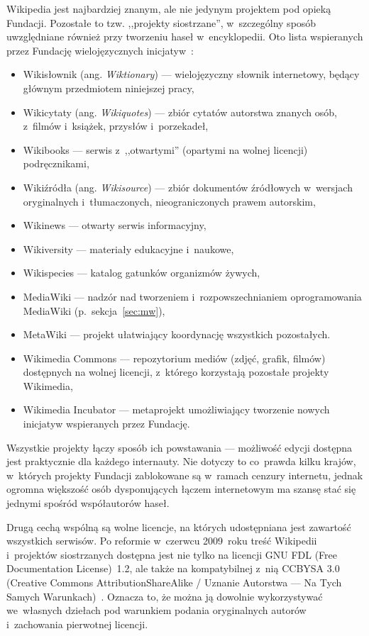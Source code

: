 Wikipedia jest najbardziej znanym, ale nie jedynym projektem pod opieką Fundacji. Pozostałe to tzw. ,,projekty siostrzane'', w~szczególny sposób uwzględniane również przy tworzeniu haseł w~encyklopedii. Oto lista wspieranych przez Fundację wielojęzycznych inicjatyw~\cite{wm:main}:
\begin{itemize}
	\item Wikisłownik (ang. \emph{Wiktionary}) --- wielojęzyczny słownik internetowy, będący głównym przedmiotem niniejszej pracy,
	\item Wikicytaty (ang. \emph{Wikiquotes}) --- zbiór cytatów autorstwa znanych osób, z~filmów i~książek, przysłów i~porzekadeł,
	\item Wikibooks --- serwis z~,,otwartymi'' (opartymi na wolnej licencji) podręcznikami,
	\item Wikiźródła (ang. \emph{Wikisource}) --- zbiór dokumentów źródłowych w~wersjach oryginalnych i~tłumaczonych, nieograniczonych prawem autorskim,
	\item Wikinews --- otwarty serwis informacyjny,
	\item Wikiversity --- materiały edukacyjne i~naukowe,
	\item Wikispecies --- katalog gatunków organizmów żywych,
	\item MediaWiki --- nadzór nad tworzeniem i~rozpowszechnianiem oprogramowania MediaWiki (p.~sekcja~\ref{sec:mw}),
	\item Meta\dywiz{}Wiki --- projekt ułatwiający koordynację wszystkich pozostałych.
	\item Wikimedia Commons --- repozytorium mediów (zdjęć, grafik, filmów) dostępnych na wolnej licencji, z~którego korzystają pozostałe projekty Wikimedia,
	\item Wikimedia Incubator --- metaprojekt umożliwiający tworzenie nowych inicjatyw wspieranych przez Fundację.
\end{itemize}
Wszystkie projekty łączy sposób ich powstawania --- możliwość edycji dostępna jest praktycznie dla każdego internauty. Nie dotyczy to co~prawda kilku krajów, w~których projekty Fundacji zablokowane są w~ramach cenzury internetu, jednak ogromna większość osób dysponujących łączem internetowym ma szansę stać się jednymi spośród współautorów haseł.

Drugą cechą wspólną są wolne licencje, na których udostępniana jest zawartość wszystkich serwisów. Po reformie w~czerwcu 2009~roku treść Wikipedii i~projektów siostrzanych dostępna jest nie tylko na licencji GNU FDL (Free Documentation License)~1.2, ale także na kompatybilnej z~nią CC\dywiz{}BY\dywiz{}SA 3.0 (Creative Commons Attribution\dywiz{}ShareAlike / Uznanie Autorstwa --- Na Tych Samych Warunkach)~\cite{wiki:license}. Oznacza to, że można ją dowolnie wykorzystywać we~własnych dziełach pod warunkiem podania oryginalnych autorów i~zachowania pierwotnej licencji.

